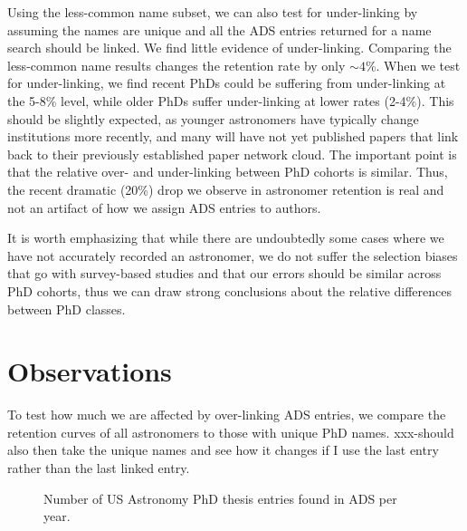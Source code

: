\documentclass[preprint2]{aastex}
\begin{document}
Using the less-common name subset, we can also test for under-linking by assuming the names are unique and all the ADS entries returned for a name search should be linked.  We find little evidence of under-linking. Comparing the less-common name results changes the retention rate by only $\sim4$\%. When we test for under-linking, we find recent PhDs could be suffering from under-linking at the 5-8\% level, while older PhDs suffer under-linking at lower rates (2-4\%).  This should be slightly expected, as younger astronomers have typically change institutions more recently, and many will have not yet published papers that link back to their previously established paper network cloud.  The important point is that the relative over- and under-linking between PhD cohorts is similar.  Thus, the recent dramatic (20\%) drop we observe in astronomer retention is real and not an artifact of how we assign ADS entries to authors.



It is worth emphasizing that while there are undoubtedly some cases where we have not accurately recorded an astronomer, we do not suffer the selection biases that go with survey-based studies and that our errors should be similar across PhD cohorts, thus we can draw strong conclusions about the relative differences between PhD classes.

\section{Observations}

To test how much we are affected by over-linking ADS entries, we compare the retention curves of all astronomers to those with unique PhD names.  xxx-should also then take the unique names and see how it changes if I use the last entry rather than the last linked entry.


\begin{figure}
  \caption{Number of US Astronomy PhD thesis entries found in ADS per year. \label{fig:phdperyear}}
\end{figure}
\end{document}
